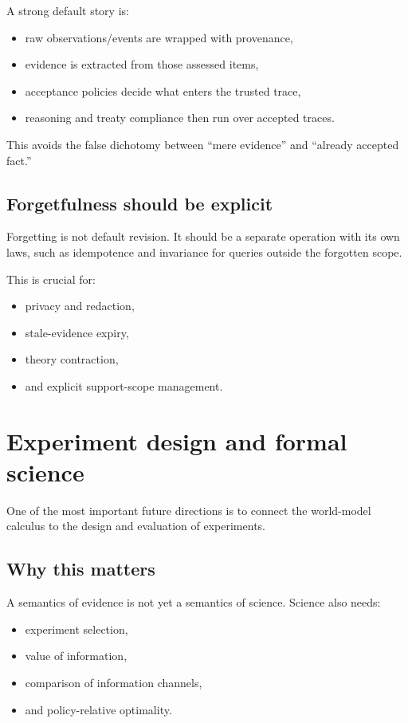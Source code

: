 \documentclass[11pt]{article}
\begin{document}
A strong default story is:
\begin{itemize}
  \item raw observations/events are wrapped with provenance,
  \item evidence is extracted from those assessed items,
  \item acceptance policies decide what enters the trusted trace,
  \item reasoning and treaty compliance then run over accepted traces.
\end{itemize}

This avoids the false dichotomy between ``mere evidence'' and ``already
accepted fact.''

\subsection{Forgetfulness should be explicit}

Forgetting is not default revision.  It should be a separate operation with its
own laws, such as idempotence and invariance for queries outside the forgotten
scope.

This is crucial for:
\begin{itemize}
  \item privacy and redaction,
  \item stale-evidence expiry,
  \item theory contraction,
  \item and explicit support-scope management.
\end{itemize}

\section{Experiment design and formal science}

One of the most important future directions is to connect the world-model
calculus to the design and evaluation of experiments.

\subsection{Why this matters}

A semantics of evidence is not yet a semantics of science.  Science also needs:
\begin{itemize}
  \item experiment selection,
  \item value of information,
  \item comparison of information channels,
  \item and policy-relative optimality.
\end{itemize}
\end{document}
